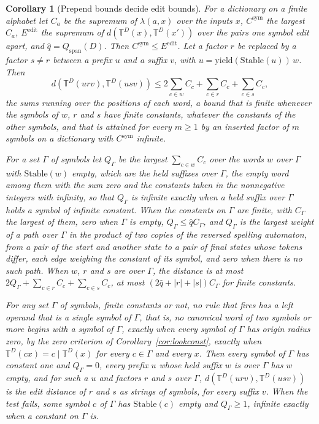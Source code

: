 \documentclass[11pt,a4paper]{article}
\theoremstyle{definition}
\theoremstyle{plain}
\newtheorem{corollary}{Corollary}
\newcommand{\T}{\mathbb{T}}
\newcommand{\yield}{\mathrm{yield}}
\newcommand{\Stable}{\mathrm{Stable}}
\newcommand{\Csym}{C^{\mathrm{sym}}}
\newcommand{\Eedit}{E^{\mathrm{edit}}}
\begin{document}
\begin{corollary}[Prepend bounds decide edit bounds]\label{cor:prependedit}
For a dictionary on a finite alphabet let \(C_a\) be the supremum of \(\lambda(a, x)\) over the inputs \(x\), \(\Csym\)
the largest \(C_a\), \(\Eedit\) the supremum of \(d(\T^D(x), \T^D(x'))\) over the pairs one symbol edit apart, and
\(\hat{q} = Q_{\mathrm{span}}(D)\). Then \(\Csym \le \Eedit\). Let a factor \(r\) be replaced by a factor \(s \ne r\)
between a prefix \(u\) and a suffix \(v\), with \(u = \yield(\Stable(u))\,w\). Then
\[
d(\T^D(urv), \T^D(usv)) \le 2\sum_{c \in w} C_c + \sum_{c \in r} C_c + \sum_{c \in s} C_c,
\]
the sums running over the positions of each word, a bound that is finite whenever the symbols of \(w\), \(r\) and \(s\)
have finite constants, whatever the constants of the other symbols, and that is attained for every \(m \ge 1\) by an
inserted factor of \(m\) symbols on a dictionary with \(\Csym\) infinite.

For a set \(\Gamma\) of symbols let \(Q_\Gamma\) be the largest \(\sum_{c \in w} C_c\) over the words \(w\) over
\(\Gamma\) with \(\Stable(w)\) empty, which are the held suffixes over \(\Gamma\), the empty word among them with the
sum zero and the constants taken in the nonnegative integers with infinity, so that \(Q_\Gamma\) is infinite exactly
when a held suffix over \(\Gamma\) holds a symbol of infinite constant. When the constants on \(\Gamma\) are finite,
with \(C_\Gamma\) the largest of them, zero when \(\Gamma\) is empty, \(Q_\Gamma \le \hat{q}C_\Gamma\), and \(Q_\Gamma\)
is the largest weight of a path over \(\Gamma\) in the product of two copies of the reversed spelling automaton, from a
pair of the start and another state to a pair of final states whose tokens differ, each edge weighing the constant of
its symbol, and zero when there is no such path. When \(w\), \(r\) and \(s\) are over \(\Gamma\), the distance is at
most \(2Q_\Gamma + \sum_{c \in r} C_c + \sum_{c \in s} C_c\), at most \((2\hat{q} + |r| + |s|)C_\Gamma\) for finite
constants.

For any set \(\Gamma\) of symbols, finite constants or not, no rule that fires has a left operand that is a single
symbol of \(\Gamma\), that is, no canonical word of two symbols or more begins with a symbol of \(\Gamma\), exactly when
every symbol of \(\Gamma\) has origin radius zero, by the zero criterion of Corollary~\ref{cor:lookconst}, exactly when
\(\T^D(cx) = c \mid \T^D(x)\) for every \(c \in \Gamma\) and every \(x\). Then every symbol of \(\Gamma\) has constant
one and \(Q_\Gamma = 0\), every prefix \(u\) whose held suffix \(w\) is over \(\Gamma\) has \(w\) empty, and for such a
\(u\) and factors \(r\) and \(s\) over \(\Gamma\), \(d(\T^D(urv), \T^D(usv))\) is the edit distance of \(r\) and \(s\)
as strings of symbols, for every suffix \(v\). When the test fails, some symbol \(c\) of \(\Gamma\) has \(\Stable(c)\)
empty and \(Q_\Gamma \ge 1\), infinite exactly when a constant on \(\Gamma\) is.


\end{corollary}
\end{document}
